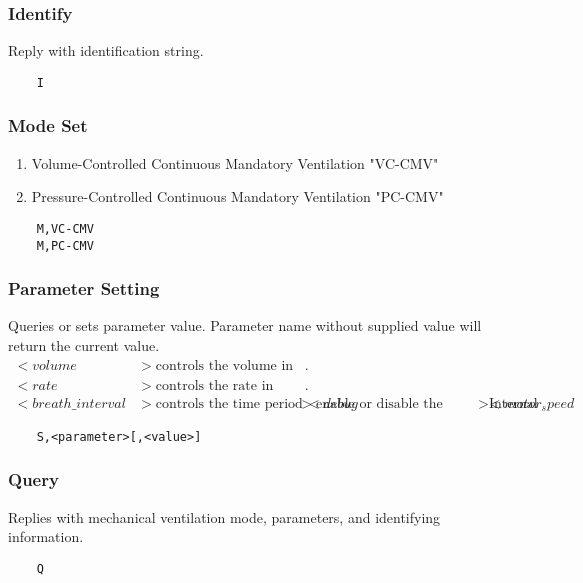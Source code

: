 \documentclass[10pt]{article}
\begin{document}
\subsubsection{Identify}
Reply with identification string.
\begin{lstlisting}
	I
\end{lstlisting}

\subsubsection{Mode Set}
\begin{enumerate}
	\item Volume-Controlled Continuous Mandatory Ventilation "VC-CMV"
	\item Pressure-Controlled Continuous Mandatory Ventilation "PC-CMV"
\end{enumerate}
\begin{lstlisting}
	M,VC-CMV
	M,PC-CMV
\end{lstlisting}

\subsubsection{Parameter Setting}
Queries or sets parameter value. Parameter name without supplied value will return the current value.
\begin{align*}
	<volume&> \text{controls the volume in mL of breaths (tidal volume)}.\\
	<rate&> \text{controls the rate in which the breath is delivered}.\\
	<breath\_interval&> \text{controls the time period between breaths in milliseconds. (Continuous Mandatory Ventilation)}
	<debug&> \text{enable or disable the internall debugging output}
	<motor_speed&> \text{Internal testing, turns motor on at a specific speed}
\end{align*}

\begin{lstlisting}
	S,<parameter>[,<value>]
\end{lstlisting}

\subsubsection{Query}
Replies with mechanical ventilation mode, parameters, and identifying information.
\begin{lstlisting}
	Q
\end{lstlisting}
\end{document}
